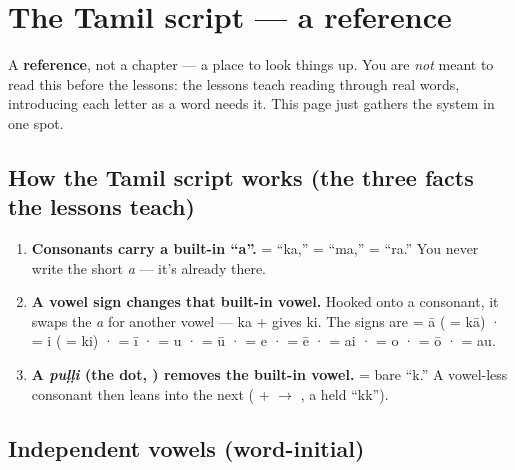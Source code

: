 
\chapter*{The Tamil script --- a reference}

A \textbf{reference}, not a chapter — a place to look things up. You are \emph{not} meant to read this before the lessons: the lessons teach reading through real words, introducing each letter as a word needs it. This page just gathers the system in one spot.

\section*{How the Tamil script works (the three facts the lessons teach)}

\begin{enumerate}
\raggedright
\setlength{\itemsep}{0.35em}
  \item \textbf{Consonants carry a built-in \textquotedblleft{}a\textquotedblright{}.}  = \textquotedblleft{}ka,\textquotedblright{}  = \textquotedblleft{}ma,\textquotedblright{}  = \textquotedblleft{}ra.\textquotedblright{} You never write the short \emph{a} — it's already there.
  \item \textbf{A vowel sign changes that built-in vowel.} Hooked onto a consonant, it swaps the \emph{a} for another vowel —  ka +  gives  ki. The signs are \textbf{} = ā ( = kā) · \textbf{} = i ( = ki) · \textbf{} = ī · \textbf{} = u · \textbf{} = ū · \textbf{} = e · \textbf{} = ē · \textbf{} = ai · \textbf{} = o · \textbf{} = ō · \textbf{} = au.
  \item \textbf{A \emph{puḷḷi} (the dot, ) removes the built-in vowel.}  = bare \textquotedblleft{}k.\textquotedblright{} A vowel-less consonant then leans into the next ( +  $\to$ , a held \textquotedblleft{}kk\textquotedblright{}).
\end{enumerate}

\section*{Independent vowels (word-initial)}

